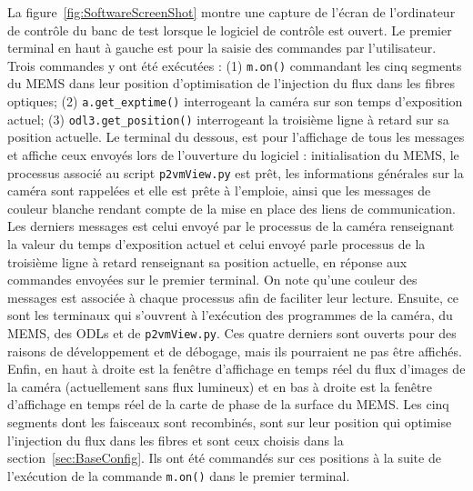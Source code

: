 La figure~\ref{fig:SoftwareScreenShot} montre une capture de l'écran de l'ordinateur de contrôle du banc de test lorsque le logiciel de contrôle est ouvert. Le premier terminal en haut à gauche est pour la saisie des commandes par l'utilisateur. Trois commandes y ont été exécutées : (1) \texttt{m.on()} commandant les cinq segments du \ac{MEMS} dans leur position d'optimisation de l'injection du flux dans les fibres optiques; (2) \texttt{a.get\_exptime()} interrogeant la caméra sur son temps d'exposition actuel; (3) \texttt{odl3.get\_position()} interrogeant la troisième ligne à retard sur sa position actuelle. Le terminal du dessous, est pour l'affichage de tous les messages et affiche ceux envoyés lors de l'ouverture du logiciel : initialisation du \ac{MEMS}, le processus associé au script \texttt{p2vmView.py} est prêt, les informations générales sur la caméra sont rappelées et elle est prête à l'emploie, ainsi que les messages de couleur blanche rendant compte de la mise en place des liens de communication. Les derniers messages est celui envoyé par le processus de la caméra renseignant la valeur du temps d'exposition actuel et celui envoyé parle processus de la troisième ligne à retard renseignant sa position actuelle, en réponse aux commandes envoyées sur le premier terminal. On note qu'une couleur des messages est associée à chaque processus afin de faciliter leur lecture. Ensuite, ce sont les terminaux qui s'ouvrent à l'exécution des programmes de la caméra, du \ac{MEMS}, des \ac{ODL}s et de \texttt{p2vmView.py}. Ces quatre derniers sont ouverts pour des raisons de développement et de débogage, mais ils pourraient ne pas être affichés. Enfin, en haut à droite est la fenêtre d'affichage en temps réel du flux d'images de la caméra (actuellement sans flux lumineux) et en bas à droite est la fenêtre d'affichage en temps réel de la carte de phase de la surface du \ac{MEMS}. Les cinq segments dont les faisceaux sont recombinés, sont sur leur position qui optimise l'injection du flux dans les fibres et sont ceux choisis dans la section~\ref{sec:BaseConfig}. Ils ont été commandés sur ces positions à la suite de l'exécution de la commande \texttt{m.on()} dans le premier terminal.

